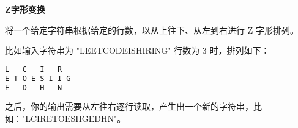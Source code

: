 \textbf{Z字形变换}\par

将一个给定字符串根据给定的行数，以从上往下、从左到右进行 Z 字形排列。\par

比如输入字符串为 "LEETCODEISHIRING" 行数为 3 时，排列如下：\par

\begin{lstlisting}[language=bash]
L   C   I   R
E T O E S I I G
E   D   H   N
\end{lstlisting}

之后，你的输出需要从左往右逐行读取，产生出一个新的字符串，比如："LCIRETOESIIGEDHN"。\par
